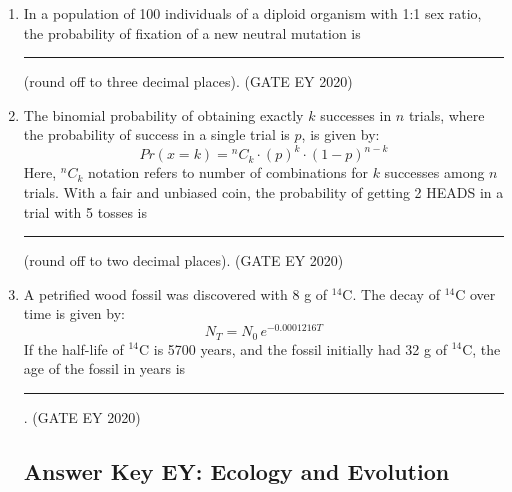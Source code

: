 \begin{enumerate}
\begin{multicols}{2}
\begin{enumerate}
\item P-iv, Q-v, R-i, S-ii
\item P-ii, Q-iv, R-iii, S-i
\item P-i, Q-ii, R-iii, S-iv
\item P-iii, Q-v, R-i, S-ii
\end{enumerate}
\end{multicols}

\item
In a population of 100 individuals of a diploid organism with 1:1 sex ratio, the probability of fixation of a new neutral mutation is \rule{2cm}{0.15mm} (round off to three decimal places). \hfill {(GATE EY 2020)}

\item
The binomial probability of obtaining exactly $k$ successes in $n$ trials, where the probability of success in a single trial is $p$, is given by:\\
\[
Pr(x=k) =  {}^nC_k{} \cdot (p)^k \cdot (1-p)^{n-k}
\]
Here, $^nC_k$ notation refers to number of combinations for $k$ successes among $n$ trials. With a fair and unbiased coin, the probability of getting 2 HEADS in a trial with 5 tosses is \rule{2cm}{0.15mm} (round off to two decimal places). \hfill {(GATE EY 2020)}

\item
A petrified wood fossil was discovered with 8 g of $^{14}$C. The decay of $^{14}$C over time is given by:\\
\[
N_T = N_0 \, e^{-0.0001216T}
\]
If the half-life of $^{14}$C is 5700 years, and the fossil initially had 32 g of $^{14}$C, the age of the fossil in years is \rule{2cm}{0.15mm}. \hfill {(GATE EY 2020)}
\newpage
\subsection{Answer Key EY: Ecology and Evolution}

\end{enumerate}



